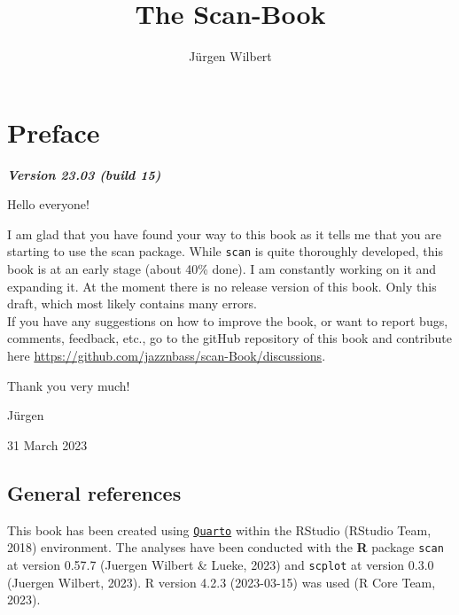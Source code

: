 \documentclass[
  letterpaper,
  DIV=11,
  numbers=noendperiod]{scrreprt}
\title{The Scan-Book}
\author{Jürgen Wilbert}
\date{}
\renewcommand*\contentsname{Table of contents}
\newcommand\contentsname{Table of contents}
\begin{document}
\maketitle
\ifdefined\Shaded\renewenvironment{Shaded}{\begin{tcolorbox}[frame hidden, boxrule=0pt, sharp corners, borderline west={3pt}{0pt}{shadecolor}, breakable, interior hidden, enhanced]}{\end{tcolorbox}}\fi

\renewcommand*\contentsname{Table of contents}
{
\hypersetup{linkcolor=}
\setcounter{tocdepth}{2}
\tableofcontents
}

\hypertarget{preface}{%
\chapter*{Preface}\label{preface}}


\textbf{\emph{Version 23.03 (build 15)}}

Hello everyone!

I am glad that you have found your way to this book as it tells me that
you are starting to use the scan package. While \texttt{scan} is quite
thoroughly developed, this book is at an early stage (about 40\% done).
I am constantly working on it and expanding it. At the moment there is
no release version of this book. Only this draft, which most likely
contains many errors.\\
If you have any suggestions on how to improve the book, or want to
report bugs, comments, feedback, etc., go to the gitHub repository of
this book and contribute here
\url{https://github.com/jazznbass/scan-Book/discussions}.

Thank you very much!

Jürgen

31 March 2023

\hypertarget{general-references}{%
\section*{General references}\label{general-references}}


This book has been created using
\href{https://quarto.org/}{\texttt{Quarto}} within the RStudio (RStudio
Team, 2018) environment. The analyses have been conducted with the
\textbf{R} package \texttt{scan} at version 0.57.7 (Juergen Wilbert \&
Lueke, 2023) and \texttt{scplot} at version 0.3.0 (Juergen Wilbert,
2023). R version 4.2.3 (2023-03-15) was used (R Core Team, 2023).
\end{document}
